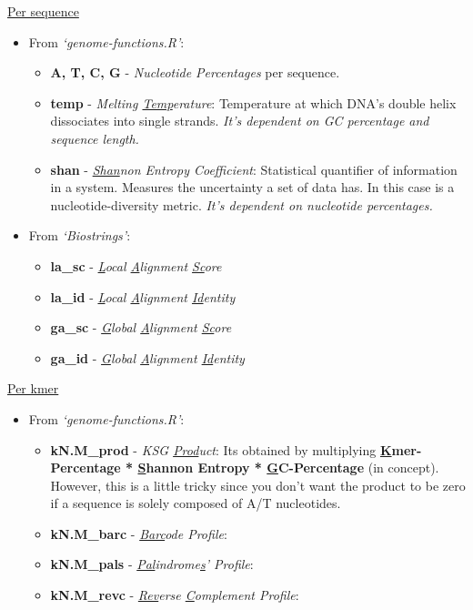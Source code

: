 \documentclass[
  letterpaper,
  DIV=11,
  numbers=noendperiod]{scrartcl}
\providecommand{\tightlist}{%
  \setlength{\itemsep}{0pt}\setlength{\parskip}{0pt}}\usepackage{longtable,booktabs,array}
\begin{document}
\underline{Per sequence}

\begin{itemize}
\tightlist
\item
  From \emph{`genome-functions.R'}:

  \begin{itemize}
  \item
    \textbf{A, T, C, G} - \emph{Nucleotide Percentages} per sequence.
  \item
    \textbf{temp} - \textit{Melting \underline{Temp}erature}:
    Temperature at which DNA's double helix dissociates into single
    strands. \emph{It's dependent on GC percentage and sequence length.}
  \item
    \textbf{shan} - \textit{\underline{Shan}non Entropy Coefficient}:
    Statistical quantifier of information in a system. Measures the
    uncertainty a set of data has. In this case is a
    nucleotide-diversity metric. \emph{It's dependent on nucleotide
    percentages.}
  \end{itemize}
\item
  From \emph{`Biostrings'}:

  \begin{itemize}
  \item
    \color{red}\textbf{la\_sc} \color{black} -
    \textit{\underline{L}ocal \underline{A}lignment \underline{Sc}ore}
  \item
    \color{red}\textbf{la\_id} \color{black} -
    \textit{\underline{L}ocal \underline{A}lignment \underline{Id}entity}
  \item
    \color{red}\textbf{ga\_sc} \color{black} -
    \textit{\underline{G}lobal \underline{A}lignment \underline{Sc}ore}
  \item
    \color{red}\textbf{ga\_id} \color{black} -
    \textit{\underline{G}lobal \underline{A}lignment \underline{Id}entity}
  \end{itemize}
\end{itemize}

\underline{Per kmer} \newfontfamily{}

\begin{itemize}
\item
  From \emph{`genome-functions.R'}:

  \begin{itemize}
  \item
    \textbf{kN.M\_prod} - \textit{KSG \underline{Prod}uct}: Its obtained
    by multiplying \mynimbus\textbf{
    \underline{K}mer-Percentage * \underline{S}hannon Entropy * \underline{G}C-Percentage}
     (in concept). However, this is a little
    tricky since you don't want the product to be zero if a sequence is
    solely composed of A/T nucleotides.
  \item
    \textbf{kN.M\_barc} - \textit{\underline{Barc}ode Profile}:
  \item
    \textbf{kN.M\_pals} -
    \textit{\underline{Pal}indrome\underline{s}' Profile}:
  \item
    \textbf{kN.M\_revc} -
    \textit{\underline{Rev}erse \underline{C}omplement Profile}:
  \end{itemize}
\end{itemize}
\end{document}
